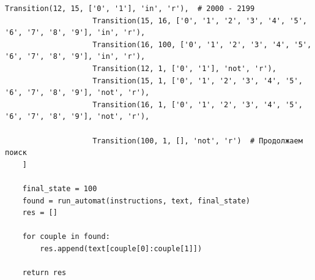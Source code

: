 \documentclass[a4paper, 14pt]{article}
\begin{document}
\begin{lstlisting}[label=some-code,caption=Автомат для поиска даты в формате mm.dd.yyyy]
                    Transition(12, 15, ['0', '1'], 'in', 'r'),  # 2000 - 2199
                    Transition(15, 16, ['0', '1', '2', '3', '4', '5', '6', '7', '8', '9'], 'in', 'r'),
                    Transition(16, 100, ['0', '1', '2', '3', '4', '5', '6', '7', '8', '9'], 'in', 'r'),
                    Transition(12, 1, ['0', '1'], 'not', 'r'),
                    Transition(15, 1, ['0', '1', '2', '3', '4', '5', '6', '7', '8', '9'], 'not', 'r'),
                    Transition(16, 1, ['0', '1', '2', '3', '4', '5', '6', '7', '8', '9'], 'not', 'r'),

                    Transition(100, 1, [], 'not', 'r')  # Продолжаем поиск
    ]

    final_state = 100
    found = run_automat(instructions, text, final_state)
    res = []

    for couple in found:
        res.append(text[couple[0]:couple[1]])

    return res
		\end{lstlisting}
\end{document}

